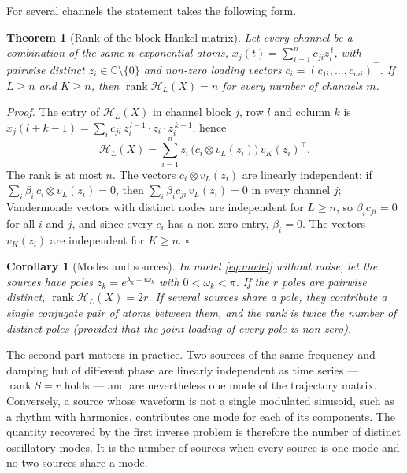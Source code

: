 \documentclass{article}
\newtheorem{theorem}{\bf Theorem}
\newtheorem{corollary}{\bf Corollary}
\begin{document}
For several channels the statement takes the following form.

\begin{theorem}[Rank of the block-Hankel matrix] \label{thm:rank}
Let every channel be a combination of the same $n$ exponential atoms, $x_j(t) = \sum_{i=1}^{n} c_{ji} z_i^{\,t}$, with pairwise distinct $z_i \in \mathbb{C} \setminus \{0\}$ and non-zero loading vectors $c_i = (c_{1i}, \dots, c_{mi})^{\top}$. If $L \ge n$ and $K \ge n$, then $\operatorname{rank} \mathcal{H}_L(X) = n$ for every number of channels $m$.
\end{theorem}

\textit{Proof.} The entry of $\mathcal{H}_L(X)$ in channel block $j$, row $l$ and column $k$ is $x_j(l + k - 1) = \sum_i c_{ji}\, z_i^{\,l-1} \cdot z_i \cdot z_i^{\,k-1}$, hence \[
\mathcal{H}_L(X) = \sum_{i=1}^{n} z_i\, \bigl(c_i \otimes v_L(z_i)\bigr)\, v_K(z_i)^{\top}.
\] The rank is at most $n$. The vectors $c_i \otimes v_L(z_i)$ are linearly independent: if $\sum_i \beta_i\, c_i \otimes v_L(z_i) = 0$, then $\sum_i \beta_i c_{ji}\, v_L(z_i) = 0$ in every channel $j$; Vandermonde vectors with distinct nodes are independent for $L \ge n$, so $\beta_i c_{ji} = 0$ for all $i$ and $j$, and since every $c_i$ has a non-zero entry, $\beta_i = 0$. The vectors $v_K(z_i)$ are independent for $K \ge n$. $\square$

\begin{corollary}[Modes and sources] \label{cor:modes}
In model \eqref{eq:model} without noise, let the sources have poles $z_k = e^{\lambda_k + i\omega_k}$ with $0 < \omega_k < \pi$. If the $r$ poles are pairwise distinct, $\operatorname{rank} \mathcal{H}_L(X) = 2r$. If several sources share a pole, they contribute a single conjugate pair of atoms between them, and the rank is twice the number of distinct poles (provided that the joint loading of every pole is non-zero).
\end{corollary}

The second part matters in practice. Two sources of the same frequency and damping but of different phase are linearly independent as time series --- $\operatorname{rank} S = r$ holds --- and are nevertheless one mode of the trajectory matrix. Conversely, a source whose waveform is not a single modulated sinusoid, such as a rhythm with harmonics, contributes one mode for each of its components. The quantity recovered by the first inverse problem is therefore the number of distinct oscillatory modes. It is the number of sources when every source is one mode and no two sources share a mode.
\end{document}
